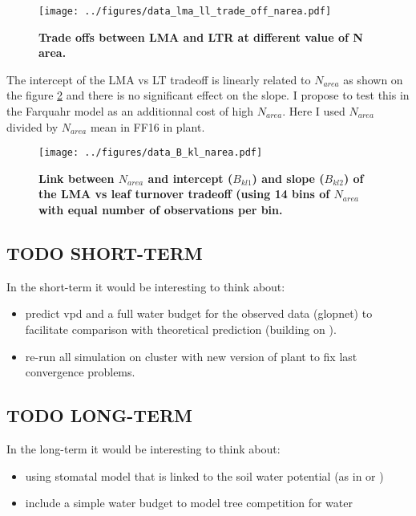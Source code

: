 \documentclass[a4paper,11pt]{article}
\begin{document}
\begin{figure}[ht]
\centering
\texttt{[image: ../figures/data\_lma\_ll\_trade\_off\_narea.pdf]}
\caption{\textbf{Trade offs between LMA and LTR at different value of N area.}
\label{fig:narea_tradeoff}}
\end{figure}

The intercept of the LMA vs LT tradeoff is linearly related to $N_{area}$ as shown on the figure \ref{fig:narea_intercept} and there is no significant effect on the slope. I propose to test this in the Farquahr model as an additionnal cost of high $N_{area}$.  Here I used $N_{area}$ divided by $N_{area}$ mean in FF16 in plant. 

\begin{figure}[ht]
\centering
\texttt{[image: ../figures/data\_B\_kl\_narea.pdf]}
\caption{\textbf{Link between $N_{area}$ and intercept ($B_{kl1}$) and slope ($B_{kl2}$) of the LMA vs leaf turnover tradeoff (using 14 bins of $N_{area}$ with equal number of observations per bin.}
\label{fig:narea_intercept}}
\end{figure}


\clearpage

\subsection{TODO SHORT-TERM}

In the short-term it would be interesting to think about:

\begin{itemize}

\item predict vpd and a full water budget for the observed data (glopnet) to facilitate comparison with theoretical prediction (building on \citet{Prentice-2014}).

\item re-run all simulation on cluster with new version of plant to fix last convergence problems.

\end{itemize}


\subsection{TODO LONG-TERM}

In the long-term it would be interesting to think about:

\begin{itemize}


\item using stomatal model that is linked to the soil water potential (as in \citet{Sperry-2016} or
\citet{Sterck-2011})

\item include a simple water budget to model tree competition for water

\end{itemize}
\end{document}
